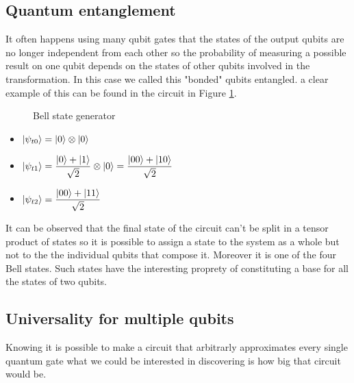 \documentclass{article}
\begin{document}

\newpage

\subsection{Quantum entanglement}

It often happens using many qubit gates that the states of the output
qubits are no longer independent from each other so the probability
of measuring a possible result on one qubit depends on the states of
other qubits involved in the transformation.
In this case we called this "bonded" qubits entangled.
a clear example of this can be found in the circuit in Figure \ref{entanglement}.\\

\begin{figure}[H]
	\centering
	\caption{Bell state generator}
	\label{entanglement}
\end{figure}

\begin{itemize}
	\item $\ket{\psi_{t0}} = \ket{0} \otimes \ket{0}$
	\item $\ket{\psi_{t1}} = \dfrac{\ket{0}+\ket{1}}{\sqrt{2}} \otimes \ket{0} = \dfrac{\ket{00}+\ket{10}}{\sqrt{2}}$
	\item $\ket{\psi_{t2}} = \dfrac{\ket{00}+\ket{11}}{\sqrt{2}}$

\end{itemize}
It can be observed that the final state of the circuit can't be split
in a tensor product of states so it is possible to assign a state to
the system as a whole but not to the the individual qubits that compose it.
Moreover it is one of the four Bell states.
Such states have the interesting proprety of constituting a base for all
the states of two qubits.


\subsection{Universality for multiple qubits}
Knowing it is possible to make a circuit that arbitrarly approximates
every
single quantum gate what we could be interested in discovering is how
big that circuit would be.\\
\end{document}
